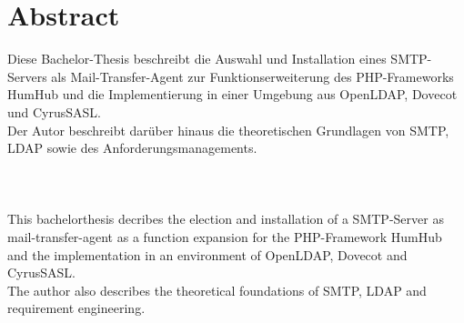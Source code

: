 


\chapter*{Abstract}
\label{sec:Abstract}

Diese Bachelor-Thesis beschreibt die Auswahl und Installation eines SMTP-Servers als Mail-Transfer-Agent zur Funktionserweiterung des PHP-Frameworks HumHub und die Implementierung in einer Umgebung aus OpenLDAP, Dovecot und CyrusSASL. \\
Der Autor beschreibt darüber hinaus die theoretischen Grundlagen von SMTP, LDAP sowie des Anforderungsmanagements.
\\
\\
\\
\\
This bachelorthesis decribes the election and installation of a SMTP-Server as mail-transfer-agent as a function expansion for the PHP-Framework HumHub and the implementation in an environment of OpenLDAP, Dovecot and CyrusSASL. \\
The author also describes the theoretical foundations of SMTP, LDAP and requirement engineering.